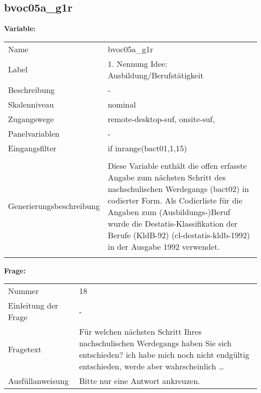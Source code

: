 	
	
	\subsection{bvoc05a\_g1r}
	\label{subSection:bvoc05a_g1r}

	\noindent\textbf{Variable:}\\
		\begin{tabular}{lL{11.3cm}}
			\label{tableVariable:bvoc05a_g1r}
			Name & bvoc05a\_g1r \\
			Label & 1. Nennung Idee: Ausbildung/Berufstätigkeit \\
			Beschreibung & - \\
			Skalenniveau & nominal \\
			Zugangswege &
				remote-desktop-suf,
				onsite-suf,
 \\
			Panelvariablen & -
			 \\
			Eingangsfilter & if inrange(bact01,1,15) \\
 \\
					Generierungsbeschreibung & Diese Variable enthält die offen erfasste Angabe zum nächsten Schritt des nachschulischen Werdegangs (bact02) in codierter Form. Als Codierliste für die Angaben zum (Ausbildungs-)Beruf wurde die Destatis-Klassifikation der Berufe (KldB-92) (cl-destatis-kldb-1992) in der Ausgabe 1992 verwendet. 
				 \\	
			 \\
		\end{tabular}

		\vspace*{1 cm}
		\noindent\textbf{Frage:}\\
		\begin{tabular}{lL{11.3cm}}
			\label{tableQuestion:bvoc05a_g1r}
			Nummer & 18 \\
			Einleitung der Frage & - \\
			Fragetext & Für welchen nächsten Schritt Ihres nachschulischen Werdegangs haben Sie sich entschieden?
ich habe mich noch nicht endgültig entschieden, werde aber wahrscheinlich … \\
			Ausfüllanweisung & Bitte nur eine Antwort ankreuzen. \\
		\end{tabular}





